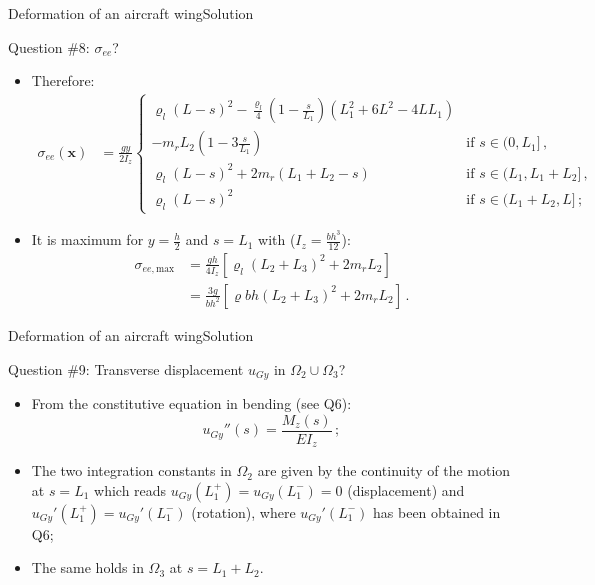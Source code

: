 \documentclass{beamer}
\newcommand{\uj}{u}
\newcommand{\xj}{x}
\newcommand{\yj}{y}
\newcommand{\zj}{z}
\newcommand{\xv}{{\boldsymbol\xj}}
\newcommand{\medium}{\Omega}
\newcommand{\roi}{\varrho}
\newcommand*{\stressj}{\sigma}
\newcommand{\Mresj}{M}
\begin{document}
\begin{frame}{Deformation of an aircraft wing}{Solution}
\begin{overprint}
\vskip-20pt
\begin{exampleblock}{Question \#8: $\stressj_{ee}$?}
\begin{itemize}
\item Therefore:
\begin{displaymath}
\begin{split}
\!\!\!\!\!\!\!\!\!\!\!\!\!\stressj_{ee}(\xv) &= \frac{g\yj}{2I_\zj}\left\{\begin{array}{ll}
\scriptstyle \!\!\!\!\roi_l(L-s)^2-\frac{\roi_l}{4}(1-\frac{s}{L_1})(L_1^2+6L^2-4LL_1) & \\
\scriptstyle  - m_rL_2\left(1-3\frac{s}{L_1}\right) & \scriptstyle\text{if $s\in(0,L_1]$}\,, \\
\scriptstyle \!\!\!\!\roi_l(L-s)^2+2m_r(L_1+L_2-s) & \scriptstyle\text{if $s\in(L_1,L_1+L_2]$}\,, \\
\scriptstyle \!\!\!\!\roi_l(L-s)^2 & \scriptstyle\text{if $s\in(L_1+L_2,L]$}\,;
\end{array}\right.
\end{split}
\end{displaymath}
\item It is maximum for $\yj=\frac{h}{2}$ and $s=L_1$ with ($I_\zj=\frac{bh^3}{12}$):
\begin{displaymath}
\begin{split}
\stressj_{ee,\text{max}} &=\frac{gh}{4I_\zj}\left[\roi_l(L_2+L_3)^2+2m_rL_2\right] \\
&=\frac{3g}{bh^2}\left[\roi bh(L_2+L_3)^2+2m_rL_2\right]\,.
\end{split}
\end{displaymath}
\end{itemize}
\end{exampleblock}

\end{overprint}

\end{frame}

\begin{frame}{Deformation of an aircraft wing}{Solution}

\vskip-20pt
\begin{exampleblock}{Question \#9: Transverse displacement $\uj_{G\yj}$ in $\medium_2\cup\medium_3$?}
\begin{itemize}
\item From the constitutive equation in bending (see Q6):
\begin{displaymath}
\uj_{G\yj}''(s)=\frac{\Mresj_\zj(s)}{EI_\zj}\,;
\end{displaymath}
\item The two integration constants in $\medium_2$ are given by the continuity of the motion at $s=L_1$ which reads $\uj_{G\yj}(L_1^+)=\uj_{G\yj}(L_1^-)=0$ (displacement) and $\uj_{G\yj}'(L_1^+)=\uj_{G\yj}'(L_1^-)$ (rotation), where $\uj_{G\yj}'(L_1^-)$ has been obtained in Q6;
\item The same holds in $\medium_3$ at $s=L_1+L_2$.
\end{itemize}
\end{exampleblock}

\end{frame}
\end{document}
